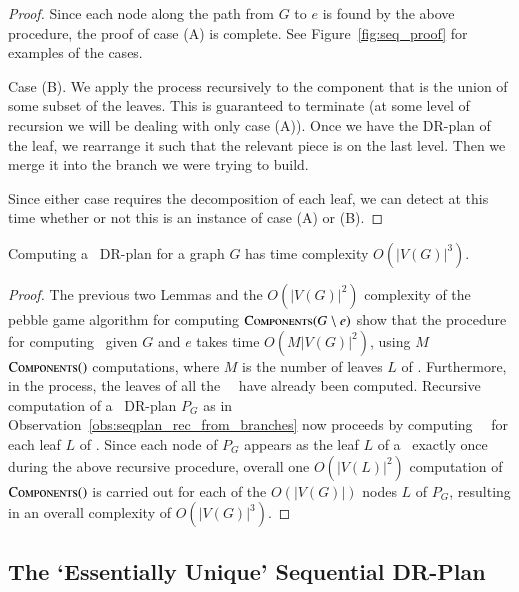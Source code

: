 \begin{proof}
    Since each node along the path from $G$ to $e$ is found by the above procedure, the proof of case (A) is complete.
    See Figure~\ref{fig:seq_proof} for examples of the cases.

    Case (B). We apply the process recursively to the component that is the union of some subset of the leaves. This is guaranteed to terminate (at some level of recursion we will be dealing with only case (A)). Once we have the DR-plan of the leaf, we rearrange it such that the relevant piece is on the last level. Then we merge it into the branch we were trying to build.

    Since either case requires the decomposition of each leaf, we can detect at this time whether or not this is an instance of case (A) or (B).
\end{proof}


\begin{theorem}
\label{theorem:algo_complexity}
    Computing a \pseudosequential\ DR-plan for a graph $G$ has time complexity $O(|V(G)|^3)$.
\end{theorem}

\begin{proof}
    The previous two Lemmas and the $O(|V(G)|^2)$ complexity of the pebble game algorithm for computing $\textsc{Components}(G\setminus e)$ show that the procedure for computing \branchGePG\ given $G$ and $e$ takes time $O(M|V(G)|^2)$, using $M$ $\textsc{Components}()$ computations, where $M$ is the number of leaves $L$ of \branchGePG. Furthermore, in the process, the leaves of all the \branches\ \branchLfPL\ have already been computed. Recursive computation of a \pseudosequential\ DR-plan $P_G$ as in Observation~\ref{obs:seqplan_rec_from_branches} now proceeds by computing \branches\ \branchLfPL\ for each leaf $L$ of \branchGePG. Since each node of $P_G$ appears as the leaf $L$ of a \branch\ exactly once during the above recursive procedure, overall one $O(|V(L)|^2)$ computation of $\textsc{Components}()$ is carried out for each of the $O(|V(G)|)$ nodes $L$ of $P_G$, resulting in an overall complexity of $O(|V(G)|^3)$.
\end{proof}



\subsection{The `Essentially Unique' Sequential DR-Plan}

